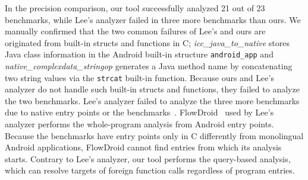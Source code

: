 
In the precision comparison, our tool successfully analyzed 21 out of 23
benchmarks, while Lee's analyzer failed in three more benchmarks than ours. We
manually confirmed that the two common failures of Lee's and ours are
originated from built-in structs and functions in C; {\it
icc\_java\_to\_native} stores Java class information in the Android built-in
structure {\tt android\_app} and {\it native\_complexdata\_stringop} generates
a Java method name by concatenating two string values via the {\tt strcat}
built-in function. Because ours and Lee's analyzer do not handle such built-in
structs and functions, they failed to analyze the two benchmarks.  Lee's
analyzer failed to analyze the three more benchmarks due to native entry points
or the benchmarks~\cite{nativeactivity}. FlowDroid~\cite{Flowdroid} used by
Lee's analyzer performs the whole-program analysis from Android entry points.
Because the benchmarks have entry points only in C differently from monolingual
Android applications, FlowDroid cannot find entries from which its analysis
starts.  Contrary to Lee's analyzer, our tool performs the query-based
analysis, which can resolve targets of foreign function calls regardless of
program entries.


